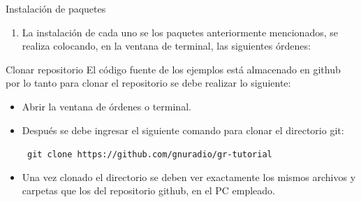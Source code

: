 
\begin{frame}{Instalación de paquetes}
\begin{enumerate}[1.]
\item La instalación de cada uno se los paquetes anteriormente mencionados, se realiza colocando, en la ventana de terminal, las siguientes órdenes:
\end{enumerate}



\end{frame}



\begin{frame}{Clonar repositorio}
El código fuente de los ejemplos está almacenado en github por lo tanto para clonar el repositorio se debe realizar lo siguiente:
\begin{itemize}
\item Abrir la ventana de órdenes o terminal.
\item Después se debe ingresar el siguiente comando para clonar el directorio git:

\begin{block}{}
  \texttt{
    git clone https://github.com/gnuradio/gr-tutorial}
  \end{block}

\item Una vez clonado el directorio se deben ver exactamente los mismos archivos y carpetas que los del repositorio github, en el PC empleado.
\end{itemize}
\end{frame}


